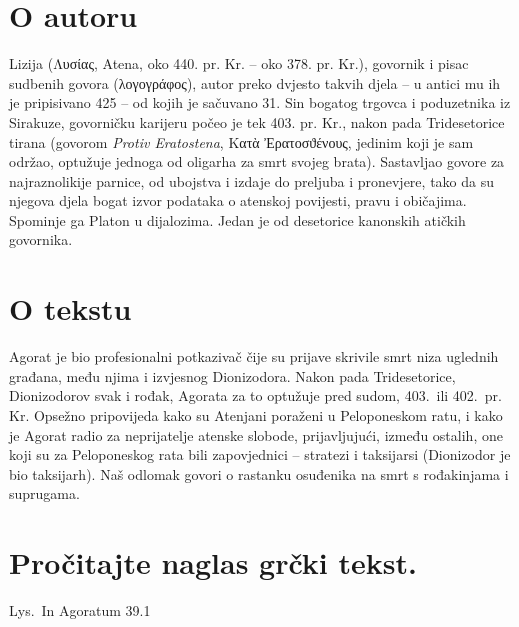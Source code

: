 
\section*{O autoru}

Lizija (Λυσίας, Atena, oko 440. pr. Kr. – oko 378. pr. Kr.), govornik i pisac sudbenih govora \textgreek[variant=ancient]{(λογογράφος),} autor preko dvjesto takvih djela – u antici mu ih je pripisivano 425 – od kojih je sačuvano 31. Sin bogatog trgovca i poduzetnika iz Sirakuze, govorničku karijeru počeo je tek 403. pr. Kr., nakon pada Tridesetorice tirana (govorom \textit{Protiv Eratostena}, \textgreek[variant=ancient]{Κατὰ Ἐρατοσϑένους,} jedinim koji je sam održao, optužuje jednoga od oligarha za smrt svojeg brata). Sastavljao govore za najraznolikije parnice, od ubojstva i izdaje do preljuba i pronevjere, tako da su njegova djela bogat izvor podataka o atenskoj povijesti, pravu i običajima. Spominje ga Platon u dijalozima. Jedan je od desetorice kanonskih atičkih govornika.

\section*{O tekstu}

Agorat je bio profesionalni potkazivač čije su prijave skrivile smrt niza uglednih građana, među njima i izvjesnog Dionizodora. Nakon pada Tridesetorice, Dionizodorov svak i rođak, Agorata za to optužuje pred sudom, 403.\ ili 402.\ pr. Kr. Opsežno pripovijeda kako su Atenjani poraženi u Peloponeskom ratu, i kako je Agorat radio za neprijatelje atenske slobode, prijavljujući, između ostalih, one koji su za Peloponeskog rata bili zapovjednici – stratezi i taksijarsi (Dionizodor je bio taksijarh). Naš odlomak govori o rastanku osuđenika na smrt s rođakinjama i suprugama.

\newpage

\section*{Pročitajte naglas grčki tekst.}

Lys.\ In Agoratum 39.1

\medskip

